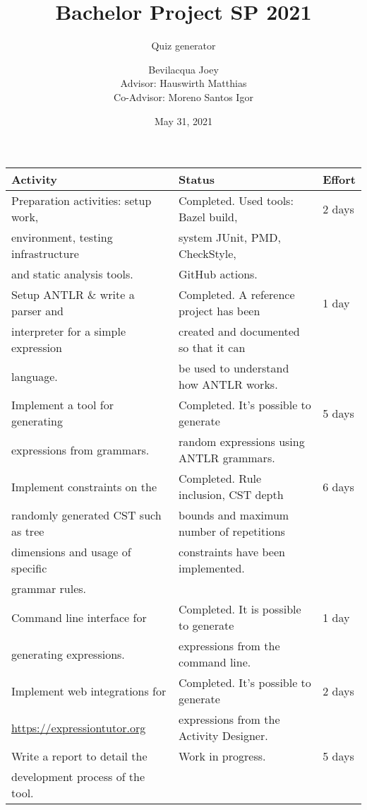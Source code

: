 \documentclass[t,aspectratio=43]{beamer}
\title{Bachelor Project SP 2021}
\subtitle{Quiz generator}
\author{Bevilacqua Joey\\Advisor: Hauswirth Matthias\\Co-Advisor: Moreno Santos Igor}
\institute{Universit\`a della Svizzera Italiana}
\date{May 31, 2021}
\begin{document}
\begin{frame}
\maketitle
\end{frame}

\begin{frame}
\begin{center}
\begin{tabular}{lll}
\textbf{Activity}                   & \textbf{Status}                           & \textbf{Effort} \\\hline
Preparation activities: setup work, & Completed. Used tools: Bazel build,       & 2 days          \\
environment, testing infrastructure & system JUnit, PMD, CheckStyle,            &                 \\
and static analysis tools.          & GitHub actions.                           &                 \\\hline
Setup ANTLR \& write a parser and   & Completed. A reference project has been   & 1 day           \\
interpreter for a simple expression & created and documented so that it can     &                 \\
language.                           & be used to understand how ANTLR works.    &                 \\\hline
Implement a tool for generating     & Completed. It's possible to generate      & 5 days          \\
expressions from grammars.          & random expressions using ANTLR grammars.  &                 \\\hline
Implement constraints on the        & Completed. Rule inclusion, CST depth      & 6 days          \\
randomly generated CST such as tree & bounds and maximum number of repetitions  &                 \\
dimensions and usage of specific    & constraints have been implemented.        &                 \\
grammar rules.                      &                                           &                 \\\hline
Command line interface for          & Completed. It is possible to generate     & 1 day           \\
generating expressions.             & expressions from the command line.        &                 \\\hline
Implement web integrations for      & Completed. It's possible to generate      & 2 days          \\
\url{https://expressiontutor.org}   & expressions from the Activity Designer.   &                 \\\hline
Write a report to detail the        & Work in progress.                         & 5 days          \\
development process of the tool.    &                                           &                 \\\hline
\end{tabular}
\end{center}
\end{frame}
\end{document}
